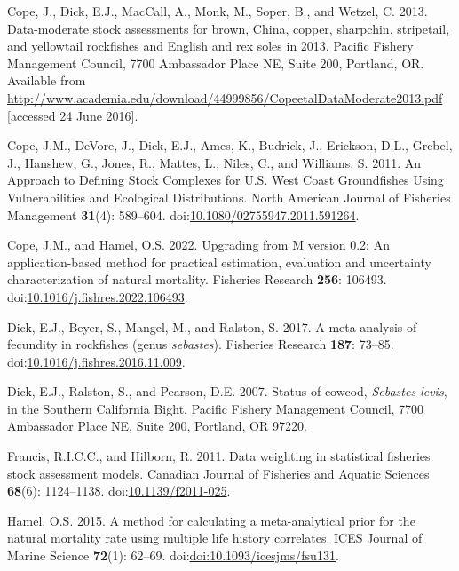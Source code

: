 \documentclass[11pt,
  english,
  letterpaper,
]{article}
\newlength{\cslhangindent}
\newenvironment{CSLReferences}[2] %
 {%
  \setlength{\parindent}{0pt}
  \ifodd #1 \everypar{\setlength{\hangindent}{\cslhangindent}}\ignorespaces\fi
  \ifnum #2 > 0
  \setlength{\parskip}{#2\baselineskip}
  \fi
 }%
 {}
\begin{document}
\begin{CSLReferences}{1}{0}
\leavevmode{}%
Cope, J., Dick, E.J., MacCall, A., Monk, M., Soper, B., and Wetzel, C. 2013. Data-moderate stock assessments for brown, {China}, copper, sharpchin, stripetail, and yellowtail rockfishes and {English} and rex soles in 2013. Pacific Fishery Management Council, 7700 Ambassador Place NE, Suite 200, Portland, OR. Available from \url{http://www.academia.edu/download/44999856/CopeetalDataModerate2013.pdf} {[}accessed 24 June 2016{]}.

\leavevmode{}%
Cope, J.M., DeVore, J., Dick, E.J., Ames, K., Budrick, J., Erickson, D.L., Grebel, J., Hanshew, G., Jones, R., Mattes, L., Niles, C., and Williams, S. 2011. An {Approach} to {Defining} {Stock} {Complexes} for {U}.{S}. {West} {Coast} {Groundfishes} {Using} {Vulnerabilities} and {Ecological} {Distributions}. North American Journal of Fisheries Management \textbf{31}(4): 589--604. doi:\href{https://doi.org/10.1080/02755947.2011.591264}{10.1080/02755947.2011.591264}.

\leavevmode{}%
Cope, J.M., and Hamel, O.S. 2022. Upgrading from {M} version 0.2: {An} application-based method for practical estimation, evaluation and uncertainty characterization of natural mortality. Fisheries Research \textbf{256}: 106493. doi:\href{https://doi.org/10.1016/j.fishres.2022.106493}{10.1016/j.fishres.2022.106493}.

\leavevmode{}%
Dick, E.J., Beyer, S., Mangel, M., and Ralston, S. 2017. A meta-analysis of fecundity in rockfishes (genus \emph{sebastes}). Fisheries Research \textbf{187}: 73--85. doi:\href{https://doi.org/10.1016/j.fishres.2016.11.009}{10.1016/j.fishres.2016.11.009}.

\leavevmode{}%
Dick, E.J., Ralston, S., and Pearson, D.E. 2007. Status of cowcod, \emph{{Sebastes} levis}, in the {Southern} {California} {Bight}. Pacific Fishery Management Council, 7700 Ambassador Place NE, Suite 200, Portland, OR 97220.

\leavevmode{}%
Francis, R.I.C.C., and Hilborn, R. 2011. Data weighting in statistical fisheries stock assessment models. Canadian Journal of Fisheries and Aquatic Sciences \textbf{68}(6): 1124--1138. doi:\href{https://doi.org/10.1139/f2011-025}{10.1139/f2011-025}.

\leavevmode{}%
Hamel, O.S. 2015. A method for calculating a meta-analytical prior for the natural mortality rate using multiple life history correlates. ICES Journal of Marine Science \textbf{72}(1): 62--69. doi:\href{https://doi.org/doi:10.1093/icesjms/fsu131}{doi:10.1093/icesjms/fsu131}.


\end{CSLReferences}
\end{document}
